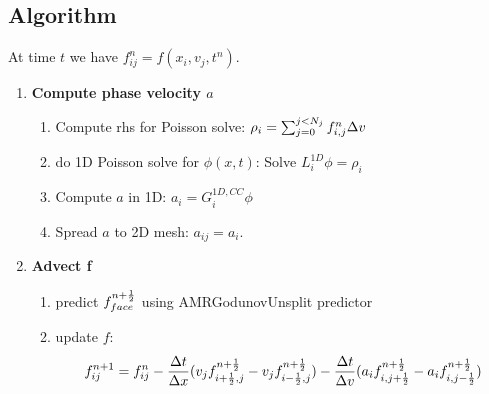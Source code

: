 \subsection{Algorithm}
At time $t$ we have $f^n_{ij} = f(x_i,v_j,t^n)$.

\begin{enumerate}
\item {\bf Compute phase velocity $a$}
\begin{enumerate}
\item Compute rhs for Poisson solve: $\rho_i = \sum_{j=0}^{j<N_j}
  f^n_{i ,j } \Delta v$ 
\item do 1D Poisson solve for $\phi(x,t)$: 
Solve $L^{1D}_i \phi = \rho_i$
\item
Compute $a$ in 1D: $a_i = G^{1D,CC}_i \phi$
\item
Spread $a$ to 2D mesh: $a_{ij} = a_i$.
\end{enumerate}
\item {\bf Advect f} 
\begin{enumerate}
\item predict $f^{n+\frac{1}{2}}_{face}$ using AMRGodunovUnsplit predictor
\item update $f$: $$f^{n+1}_{ij} = f^{n}_{ij} - \frac{\Delta t}{\Delta x}
(v_j f^{n+\frac{1}{2}}_{i+\frac{1}{2},j} - v_j f^{n+\frac{1}{2}}_{i-\frac{1}{2},j}) - \frac{\Delta
  t}{\Delta v}(a_i f^{n+\frac{1}{2}}_{i,j+\frac{1}{2}} - a_i f^{n+\frac{1}{2}}_{i,j-\frac{1}{2}})$$
\end{enumerate}

\end{enumerate}


